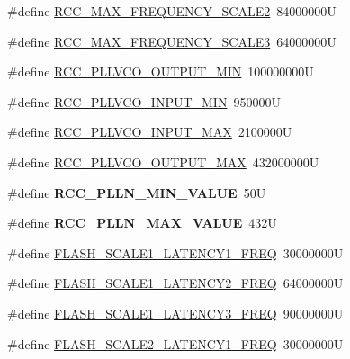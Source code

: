 \begin{DoxyCompactItemize}
\item 
\#define \hyperlink{group___exported__macros_gafcb2c5211d9cbed86b111c83a0ce427b}{R\+C\+C\+\_\+\+M\+A\+X\+\_\+\+F\+R\+E\+Q\+U\+E\+N\+C\+Y\+\_\+\+S\+C\+A\+L\+E2}~84000000U
\item 
\#define \hyperlink{group___exported__macros_ga60fbed15643b623aa4541b9d8828d0f1}{R\+C\+C\+\_\+\+M\+A\+X\+\_\+\+F\+R\+E\+Q\+U\+E\+N\+C\+Y\+\_\+\+S\+C\+A\+L\+E3}~64000000U
\item 
\#define \hyperlink{group___exported__macros_ga85746dffdc6d015f5142d7e16489ca84}{R\+C\+C\+\_\+\+P\+L\+L\+V\+C\+O\+\_\+\+O\+U\+T\+P\+U\+T\+\_\+\+M\+IN}~100000000U
\item 
\#define \hyperlink{group___exported__macros_ga288d68c2604cea8548eccdef3873923f}{R\+C\+C\+\_\+\+P\+L\+L\+V\+C\+O\+\_\+\+I\+N\+P\+U\+T\+\_\+\+M\+IN}~950000U
\item 
\#define \hyperlink{group___exported__macros_gad3fd37dbfa74739a3c698ab4755fa27e}{R\+C\+C\+\_\+\+P\+L\+L\+V\+C\+O\+\_\+\+I\+N\+P\+U\+T\+\_\+\+M\+AX}~2100000U
\item 
\#define \hyperlink{group___exported__macros_gaba6ddae0375763847f8dc3e91173d714}{R\+C\+C\+\_\+\+P\+L\+L\+V\+C\+O\+\_\+\+O\+U\+T\+P\+U\+T\+\_\+\+M\+AX}~432000000U
\item 
\mbox{\label{group___exported__macros_ga6015e60e123ddde47bb3ddfab170c5a1}} 
\#define {\bfseries R\+C\+C\+\_\+\+P\+L\+L\+N\+\_\+\+M\+I\+N\+\_\+\+V\+A\+L\+UE}~50U
\item 
\mbox{\label{group___exported__macros_ga9d6c2fd92a420bb80caf8ca2cadb6a62}} 
\#define {\bfseries R\+C\+C\+\_\+\+P\+L\+L\+N\+\_\+\+M\+A\+X\+\_\+\+V\+A\+L\+UE}~432U
\item 
\#define \hyperlink{group___exported__macros_ga980965268c210a75ca5bb1e6b59b4052}{F\+L\+A\+S\+H\+\_\+\+S\+C\+A\+L\+E1\+\_\+\+L\+A\+T\+E\+N\+C\+Y1\+\_\+\+F\+R\+EQ}~30000000U
\item 
\#define \hyperlink{group___exported__macros_ga53673600707f291baa71c30919f8da98}{F\+L\+A\+S\+H\+\_\+\+S\+C\+A\+L\+E1\+\_\+\+L\+A\+T\+E\+N\+C\+Y2\+\_\+\+F\+R\+EQ}~64000000U
\item 
\#define \hyperlink{group___exported__macros_ga547cb8d59cf6a2a73a0f76331e4492df}{F\+L\+A\+S\+H\+\_\+\+S\+C\+A\+L\+E1\+\_\+\+L\+A\+T\+E\+N\+C\+Y3\+\_\+\+F\+R\+EQ}~90000000U
\item 
\#define \hyperlink{group___exported__macros_ga19ba80e0c72cd041274f831901f302f9}{F\+L\+A\+S\+H\+\_\+\+S\+C\+A\+L\+E2\+\_\+\+L\+A\+T\+E\+N\+C\+Y1\+\_\+\+F\+R\+EQ}~30000000U

\end{DoxyCompactItemize}
